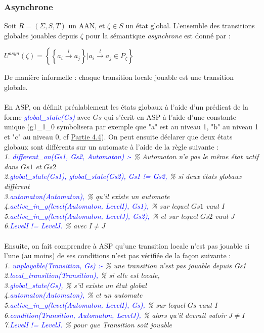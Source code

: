\documentclass[10pt,a4paper]{article}
\begin{document}
\subsubsection{Asynchrone}
Soit $R = (\Sigma,S,T)$ un AAN, et $\zeta\in S$ un état global. L'ensemble des transitions globales jouables depuis $\zeta$ pour la sémantique \emph{asynchrone} est donné par :
\begin{center}
	$U^{asyn}(\zeta)=\left\{\left\{a_i\xrightarrow{l} a_j\right\}|a_i\xrightarrow{l} a_j\in P_{\zeta}\right\}$
\end{center}
De manière informelle : chaque transition locale jouable est une transition globale.\\ \\
En ASP, on définit préalablement les états globaux à l'aide d'un prédicat de la forme \emph{\textcolor{blue}{global\_state(Gs)}} avec $Gs$ qui s'écrit en ASP à l'aide d'une constante unique (g1\_1\_0 symbolisera par exemple que "a" 
est au niveau 1, "b" au niveau 1 et "c" au niveau 0, cf \hyperlink{partie4.4}{Partie 4.4}). On peut ensuite déclarer que deux états globaux sont différents sur un automate à l'aide de la règle suivante :\\
\emph{
1. \textcolor{blue}{different\_on(Gs1, Gs2, Automaton) :-} \% Automaton n'a pas le même état actif dans $Gs1$ et $Gs2$\\
2.\qquad \textcolor{blue}{global\_state(Gs1), global\_state(Gs2), Gs1 != Gs2,} \% si deux états globaux diffèrent\\
3.\qquad \textcolor{blue}{automaton(Automaton),} \% qu'il existe un automate\\
4.\qquad \textcolor{blue}{active\_in\_g(level(Automaton, LevelI), Gs1),} \% sur lequel $Gs1$ vaut $I$\\
5.\qquad \textcolor{blue}{active\_in\_g(level(Automaton, LevelJ), Gs2),} \% et sur lequel $Gs2$ vaut $J$\\
6.\qquad \textcolor{blue}{LevelI != LevelJ.} \% avec $I \neq J$\\ \\
}
Ensuite, on fait comprendre à ASP qu'une transition locale n'est pas jouable si l'une (au moins) de ses conditions n'est pas vérifiée de la façon suivante :\\
\emph{
1. \textcolor{blue}{unplayable(Transition, Gs) :-} \% une transition n'est pas jouable depuis Gs1\\
2.\qquad \textcolor{blue}{local\_transition(Transition),} \% si elle est locale,\\
3.\qquad \textcolor{blue}{global\_state(Gs),} \% s'il existe un état global\\
4.\qquad \textcolor{blue}{automaton(Automaton),} \% et un automate\\
5.\qquad \textcolor{blue}{active\_in\_g(level(Automaton, LevelI), Gs),} \% sur lequel $Gs$ vaut $I$\\
6.\qquad \textcolor{blue}{condition(Transition, Automaton, LevelJ),} \% alors qu'il devrait valoir $J\neq I$\\
7.\qquad \textcolor{blue}{LevelI != LevelJ.} \% pour que Transition soit jouable\\ \\
}
\end{document}

